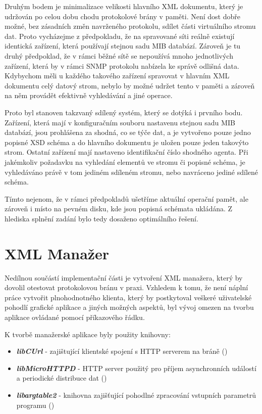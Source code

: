 Druhým bodem je minimalizace velikosti hlavního XML dokumentu, který je udržován po celou dobu chodu protokolové brány v paměti. Není dost dobře možné, bez zásadních změn
navrženého protokolu, sdílet části virtuálního stromu dat. Proto vycházejme z předpokladu, že na spravované síti reálně existují identická zařízení, která používají
stejnou sadu MIB databází. Zároveň je tu druhý předpoklad, že v rámci běžné sítě se nepoužívá mnoho jednotlivých zařízení, která by v rámci SNMP protokolu nabízela ke správě odlišná data.
Kdybychom měli u každého takového zařízení spravovat v hlavním XML dokumentu celý datový strom, nebylo by možné udržet tento v paměti a zároveň na něm provádět
efektivně vyhledávání a jiné operace.

Proto byl stanoven takzvaný sdílený systém, který se dotýká i prvního bodu. Zařízení, která mají v konfiguračním souboru nastavenu stejnou sadu MIB databází, jsou prohlášena za shodná, co se týče
dat, a je vytvořeno pouze jedno popisné XSD schéma a do hlavního dokumentu je uložen pouze jeden takovýto strom. Ostatní zařízení mají nastaveno identifikační číslo shodného agenta.
Při jakémkoliv požadavku na vyhledání elementů ve stromu či popisné schéma, je vyhledáváno právě v tom jediném sdíleném stromu, nebo navráceno jediné sdílené schéma.

Tímto nejenom, že v rámci předpokladů ušetříme aktuální operační pamět, ale zároveň i místo na pevném disku, kde jsou popisná schémata ukládána. Z hlediska splnění zadání bylo tedy
dosaženo optimálního řešení.


\section{XML Manažer}
Nedílnou součástí implementační části je vytvoření XML manažera, který by dovolil otestovat protokolovou bránu v praxi. Vzhledem k tomu, že není náplní práce vytvořit plnohodnotného
klienta, který by postkytoval veškeré uživatelské pohodlí grafické aplikace a jiných možných aspektů, byl vývoj omezen na tvorbu aplikace ovládané pomocí příkazového řádku.

K tvorbě manažerské aplikace byly použity knihovny:
\begin{itemize}
	\item \textbf{ \textit{libCUrl} } - zajištující klientské spojení s HTTP serverem na bráně (\cite{libcurl})
	\item \textbf{ \textit{libMicroHTTPD} } - HTTP server použitý pro příjem asynchronních událostí a periodické distribuce dat (\cite{libmicrohttpd})
	\item \textbf{ \textit{libargtable2} } - knihovna zajišťující pohodlné zpracování vstupních parametrů programu (\cite{argtable})
\end{itemize}

